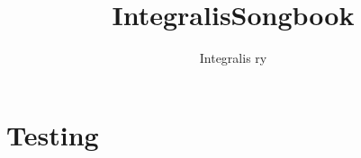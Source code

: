 \documentclass{article}
\title{IntegralisSongbook}
\author{Integralis ry}
\begin{document}
\maketitle

\section{Testing}
\end{document}
